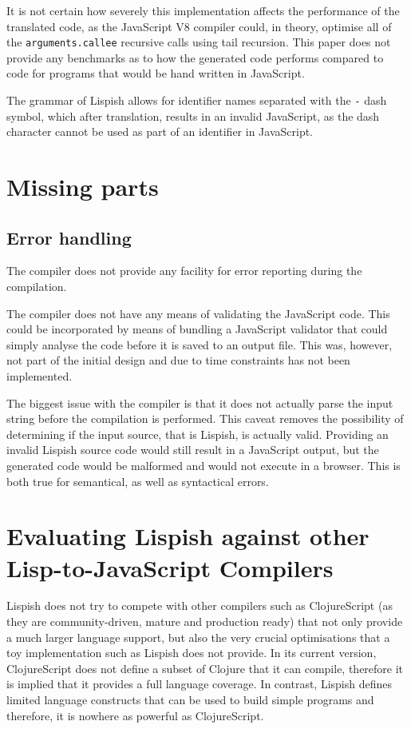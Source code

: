 It is not certain how severely this implementation affects the performance of the translated code, as the JavaScript V8 compiler could, in theory, optimise all of the \texttt{arguments.callee} recursive calls using tail recursion. 
This paper does not provide any benchmarks as to how the generated code performs compared to code for programs that would be hand written in JavaScript. 

The grammar of Lispish allows for identifier names separated with the \texttt{-} dash symbol, which after translation, results in an invalid JavaScript, as the dash character cannot be used as part of an identifier in JavaScript.

\section{Missing parts}
\subsection{Error handling}
The compiler does not provide any facility for error reporting during the compilation.

The compiler does not have any means of validating the JavaScript code. This could be incorporated by means of bundling a JavaScript validator that could simply analyse the code before it is saved to an output file. This was, however, not part of the initial design and due to time constraints has not been implemented.

The biggest issue with the compiler is that it does not actually parse the input string before the compilation is performed. This caveat removes the possibility of determining if the input source, that is Lispish, is actually valid. 
Providing an invalid Lispish source code would still result in a JavaScript output, but the generated code would be malformed and would not execute in a browser. This is both true for semantical, as well as syntactical errors.

\section{Evaluating Lispish against other Lisp-to-JavaScript Compilers}\label{lispish-vs-rest}

Lispish does not try to compete with other compilers such as ClojureScript (as they are community-driven, mature and production ready) that not only provide a much larger language support, but also the very crucial optimisations that a toy implementation such as Lispish does not provide. In its current version, ClojureScript does not define a subset of Clojure that it can compile, therefore it is implied that it provides a full language coverage. In contrast, Lispish defines limited language constructs that can be used to build simple programs and therefore, it is nowhere as powerful as ClojureScript.

